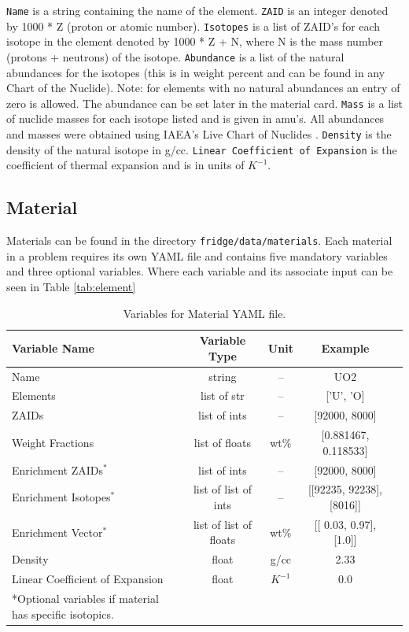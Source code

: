 \documentclass{article}
\begin{document}
\verb|Name| is a string containing the name of the element. \verb|ZAID| is an integer denoted by 1000 * Z (proton or atomic number). \verb|Isotopes| is a list of ZAID's for each isotope in the element denoted by 1000 * Z + N, where N is the mass number (protons + neutrons) of the isotope. \verb|Abundance| is a list of the natural abundances for the isotopes (this is in weight percent and can be found in any Chart of the Nuclide). Note: for elements with no natural abundances an entry of zero is allowed. The abundance can be set later in the material card. \verb|Mass| is a list of nuclide masses for each isotope listed and is given in amu's. All abundances and masses were obtained using IAEA's Live Chart of Nuclides \cite{CotN}. \verb|Density| is the density of the natural isotope in g/cc. \verb|Linear Coefficient of Expansion| is the coefficient of thermal expansion and is in units of $K^{-1}$.

\subsection{Material}

Materials can be found in the directory \verb|fridge/data/materials|. Each material in a problem requires its own YAML file and contains five mandatory variables and three optional variables. Where each variable and its associate input can be seen in Table \ref{tab:element}

\begin{table}
	\centering
	\caption{Variables for Material YAML file.}
	\begin{tabular}{lcccc}\toprule
		Variable Name   & Variable Type & Unit & Example 
		\\
		\hline
		Name  & string & -- & UO2
		\\
		Elements & list of str & -- & ['U', 'O]
		\\		
		ZAIDs & list of ints & -- & [92000, 8000]
		\\
	    Weight Fractions & list of floats & wt\% & [0.881467, 0.118533]
		\\
		Enrichment ZAIDs$^*$ & list of ints & -- & [92000, 8000]
		\\
		Enrichment Isotopes$^*$ & list of list of ints & -- & [[92235, 92238], [8016]]
		\\
		Enrichment Vector$^*$ & list of list of floats & wt\% & [[ 0.03, 0.97], [1.0]]
		\\		
		Density & float & g/cc & 2.33
		\\
		Linear Coefficient of Expansion & float & $K^{-1}$ &0.0
		\\
		\bottomrule
	*Optional variables if material has specific isotopics.
	\end{tabular}
	\label{tab:material}
\end{table}
\end{document}
